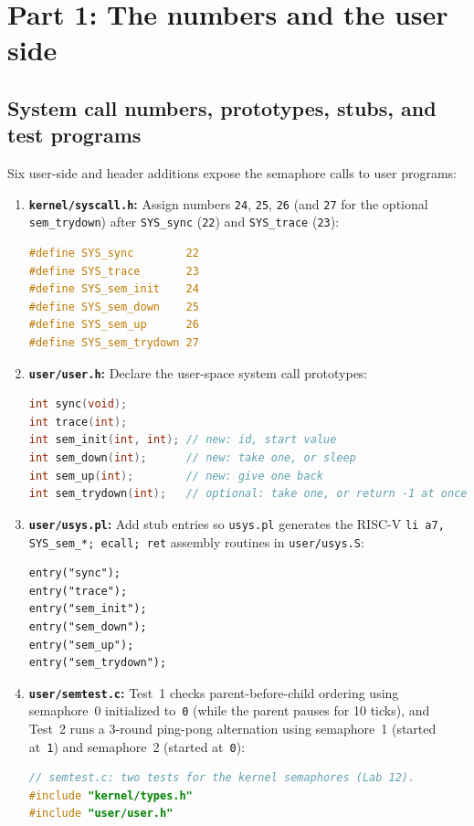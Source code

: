 \documentclass{../latex/utmreport}
\providecommand{\tightlist}{\setlength{\itemsep}{0pt}\setlength{\parskip}{0pt}}
\begin{document}
\chapter{Part 1: The numbers and the user side}

\section{System call numbers, prototypes, stubs, and test programs}

Six user-side and header additions expose the semaphore calls to user programs:

\begin{enumerate}
\tightlist
\item \textbf{\texttt{kernel/syscall.h}:} Assign numbers \texttt{24}, \texttt{25}, \texttt{26} (and \texttt{27} for the optional \texttt{sem\_trydown}) after \texttt{SYS\_sync} (\texttt{22}) and \texttt{SYS\_trace} (\texttt{23}):
\begin{lstlisting}[language=C]
#define SYS_sync        22
#define SYS_trace       23
#define SYS_sem_init    24
#define SYS_sem_down    25
#define SYS_sem_up      26
#define SYS_sem_trydown 27
\end{lstlisting}

\item \textbf{\texttt{user/user.h}:} Declare the user-space system call prototypes:
\begin{lstlisting}[language=C]
int sync(void);
int trace(int);
int sem_init(int, int); // new: id, start value
int sem_down(int);      // new: take one, or sleep
int sem_up(int);        // new: give one back
int sem_trydown(int);   // optional: take one, or return -1 at once
\end{lstlisting}

\item \textbf{\texttt{user/usys.pl}:} Add stub entries so \texttt{usys.pl} generates the RISC-V \texttt{li a7, SYS\_sem\_*; ecall; ret} assembly routines in \texttt{user/usys.S}:
\begin{lstlisting}
entry("sync");
entry("trace");
entry("sem_init");
entry("sem_down");
entry("sem_up");
entry("sem_trydown");
\end{lstlisting}

\item \textbf{\texttt{user/semtest.c}:} Test~1 checks parent-before-child ordering using semaphore~0 initialized to~\texttt{0} (while the parent pauses for 10 ticks), and Test~2 runs a 3-round ping-pong alternation using semaphore~1 (started at~\texttt{1}) and semaphore~2 (started at~\texttt{0}):
\begin{lstlisting}[language=C]
// semtest.c: two tests for the kernel semaphores (Lab 12).
#include "kernel/types.h"
#include "user/user.h"


\end{lstlisting}
\end{enumerate}
\end{document}
